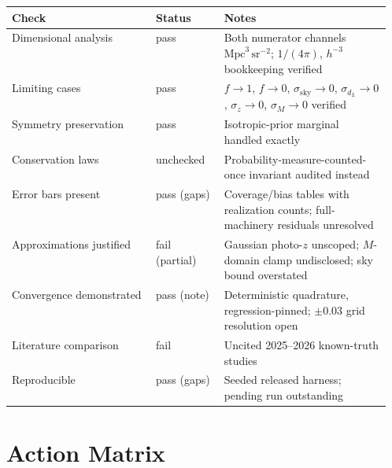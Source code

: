 \documentclass[11pt]{article}
\begin{document}
\begin{tabularx}{\linewidth}{@{}p{0.38\linewidth}p{0.18\linewidth}Y@{}}
\toprule
\textbf{Check} & \textbf{Status} & \textbf{Notes} \\
\midrule
Dimensional analysis & pass & Both numerator channels $\mathrm{Mpc}^3\,\mathrm{sr}^{-2}$; $1/(4\pi)$, $h^{-3}$ bookkeeping verified \\
Limiting cases & pass & $f\to1$, $f\to0$, $\sigma_\mathrm{sky}\to0$, $\sigma_{d_L}\to0$, $\sigma_z\to0$, $\sigma_M\to0$ verified \\
Symmetry preservation & pass & Isotropic-prior marginal handled exactly \\
Conservation laws & unchecked & Probability-measure-counted-once invariant audited instead \\
Error bars present & pass (gaps) & Coverage/bias tables with realization counts; full-machinery residuals unresolved \\
Approximations justified & fail (partial) & Gaussian photo-$z$ unscoped; $M$-domain clamp undisclosed; sky bound overstated \\
Convergence demonstrated & pass (note) & Deterministic quadrature, regression-pinned; $\pm 0.03$ grid resolution open \\
Literature comparison & fail & Uncited 2025--2026 known-truth studies \\
Reproducible & pass (gaps) & Seeded released harness; pending run outstanding \\
\bottomrule
\end{tabularx}

\section*{Action Matrix}
\end{document}
